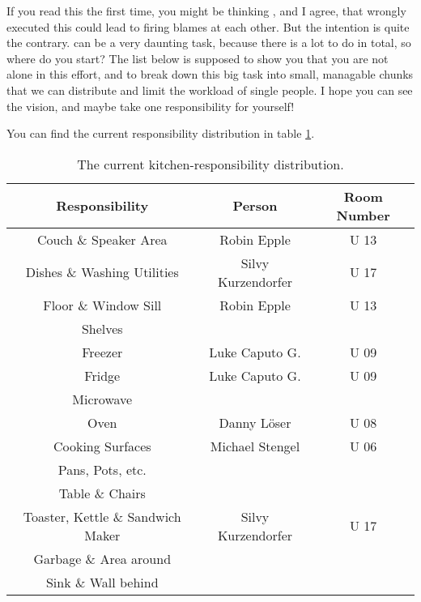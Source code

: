 If you read this the first time, you might be thinking , and I agree, that wrongly executed this could lead to firing blames at each other. But the intention is quite the contrary.  can be a very daunting task, because there is a lot to do in total, so where do you start? The list below is supposed to show you that you are not alone in this effort, and to break down this big task into small, managable chunks that we can distribute and limit the workload of single people. I hope you can see the vision, and maybe take one responsibility for yourself!

You can find the current responsibility distribution in table \ref{tab:kitchen-responsibilities}.

\begin{table}[htp]
    \centering
    \begin{tabular}{ccc}
        \rowcolor[HTML]{F89646} 
        Responsibility                    & Person             & Room Number \\ \hline
        Couch \& Speaker Area             & Robin Epple        & U 13        \\ \hline
        Dishes \& Washing Utilities       & Silvy Kurzendorfer & U 17        \\ \hline
        Floor \& Window Sill              & Robin Epple        & U 13        \\ \hline
        Shelves                           &                    &             \\ \hline
        Freezer                           & Luke Caputo G.     & U 09        \\ \hline
        Fridge                            & Luke Caputo G.     & U 09        \\ \hline
        Microwave                         &                    &             \\ \hline
        Oven                              & Danny Löser        & U 08        \\ \hline
        Cooking Surfaces                  & Michael Stengel    & U 06        \\ \hline
        Pans, Pots, etc.                  &                    &             \\ \hline
        Table \& Chairs                   &                    &             \\ \hline
        Toaster, Kettle \& Sandwich Maker & Silvy Kurzendorfer & U 17        \\ \hline
        Garbage \& Area around            &                    &             \\ \hline
        Sink \& Wall behind               &                    &             \\ \hline
    \end{tabular}
    \caption{The current kitchen-responsibility distribution.}
    \label{tab:kitchen-responsibilities}
\end{table}


